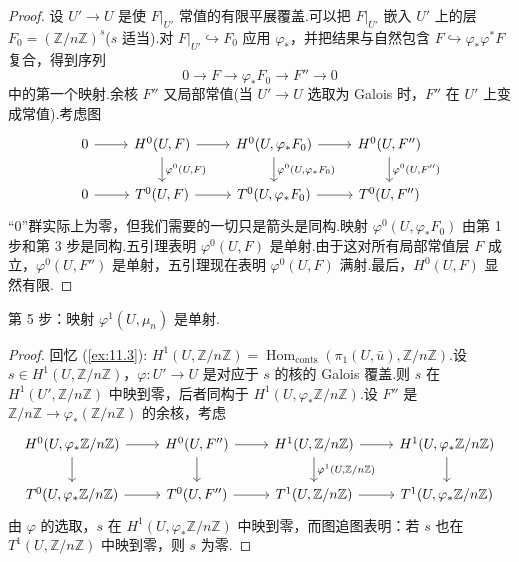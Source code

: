 \begin{proof}
设 $U' \to U$ 是使 $F|_{U'}$ 常值的有限平展覆盖.可以把 $F|_{U'}$ 嵌入 $U'$ 上的层 $F_0 = (\mathbb{Z}/n\mathbb{Z})^{s}$($s$ 适当).对 $F|_{U'} \hookrightarrow F_0$ 应用 $\varphi_{*}$，并把结果与自然包含 $F \hookrightarrow \varphi_{*}\varphi^{*}F$ 复合，得到序列
\[
0 \to F \to \varphi_{*}F_0 \to F'' \to 0
\]
中的第一个映射.余核 $F''$ 又局部常值(当 $U' \to U$ 选取为 Galois 时，$F''$ 在 $U'$ 上变成常值).考虑图
\[
\begin{tikzcd}
0 \arrow[r] & H^{0}(U, F) \arrow[r] \arrow[d, "{\varphi^{0}(U,F)}"] & H^{0}(U, \varphi_{*}F_0) \arrow[r] \arrow[d, "{\varphi^{0}(U,\varphi_{*}F_0)}"] & H^{0}(U, F'') \arrow[d, "{\varphi^{0}(U,F'')}"] \\
0 \arrow[r] & T^{0}(U, F) \arrow[r] & T^{0}(U, \varphi_{*}F_0) \arrow[r] & T^{0}(U, F'')
\end{tikzcd}
\]
``$0$''群实际上为零，但我们需要的一切只是箭头是同构.映射 $\varphi^{0}(U, \varphi_{*}F_0)$ 由第 1 步和第 3 步是同构.五引理表明 $\varphi^{0}(U, F)$ 是单射.由于这对所有局部常值层 $F$ 成立，$\varphi^{0}(U, F'')$ 是单射，五引理现在表明 $\varphi^{0}(U, F)$ 满射.最后，$H^{0}(U, F)$ 显然有限.
\end{proof}

第 5 步：映射 $\varphi^{1}(U, \mu_n)$ 是单射.

\begin{proof}
回忆 (\ref{ex:11.3}): $H^{1}(U, \mathbb{Z}/n\mathbb{Z}) = \operatorname{Hom}_{\mathrm{conts}}(\pi_1(U, \bar{u}), \mathbb{Z}/n\mathbb{Z})$.设 $s \in H^{1}(U, \mathbb{Z}/n\mathbb{Z})$，$\varphi \colon U' \to U$ 是对应于 $s$ 的核的 Galois 覆盖.则 $s$ 在 $H^{1}(U', \mathbb{Z}/n\mathbb{Z})$ 中映到零，后者同构于 $H^{1}(U, \varphi_{*}\mathbb{Z}/n\mathbb{Z})$.设 $F''$ 是 $\mathbb{Z}/n\mathbb{Z} \to \varphi_{*}(\mathbb{Z}/n\mathbb{Z})$ 的余核，考虑
\[
\begin{tikzcd}
H^{0}(U, \varphi_{*}\mathbb{Z}/n\mathbb{Z}) \arrow[r] \arrow[d] & H^{0}(U, F'') \arrow[r] \arrow[d] & H^{1}(U, \mathbb{Z}/n\mathbb{Z}) \arrow[r] \arrow[d, "{\varphi^{1}(U,\mathbb{Z}/n\mathbb{Z})}"] & H^{1}(U, \varphi_{*}\mathbb{Z}/n\mathbb{Z}) \arrow[d] \\
T^{0}(U, \varphi_{*}\mathbb{Z}/n\mathbb{Z}) \arrow[r] & T^{0}(U, F'') \arrow[r] & T^{1}(U, \mathbb{Z}/n\mathbb{Z}) \arrow[r] & T^{1}(U, \varphi_{*}\mathbb{Z}/n\mathbb{Z})
\end{tikzcd}
\]
由 $\varphi$ 的选取，$s$ 在 $H^{1}(U, \varphi_{*}\mathbb{Z}/n\mathbb{Z})$ 中映到零，而图追图表明：若 $s$ 也在 $T^{1}(U, \mathbb{Z}/n\mathbb{Z})$ 中映到零，则 $s$ 为零.
\end{proof}

